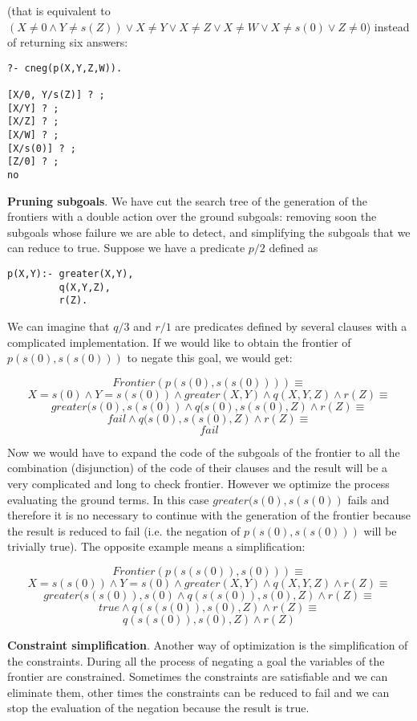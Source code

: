 \documentclass{llncs}
\begin{document}
\noindent
(that is equivalent to $ (X \neq0 \wedge Y\neq s(Z)) \vee X \neq Y
\vee X \neq Z \vee X \neq W \vee X \neq s(0) \vee Z \neq 0$)
instead of returning six answers:
\begin{verbatim}
?- cneg(p(X,Y,Z,W)).

[X/0, Y/s(Z)] ? ;
[X/Y] ? ;
[X/Z] ? ;
[X/W] ? ;
[X/s(0)] ? ;
[Z/0] ? ;
no
\end{verbatim}


\noindent
{\bf Pruning subgoals}. We have cut the search tree of the generation
of the frontiers with a double action over the ground subgoals:
removing soon the subgoals whose failure we are able to detect, and
simplifying the subgoals that we can reduce to true. Suppose we have a
predicate $p/2$ defined as
\begin{verbatim}
p(X,Y):- greater(X,Y),
         q(X,Y,Z),
         r(Z).
\end{verbatim}
We can imagine that $q/3$ and $r/1$ are predicates defined by several
clauses with a complicated implementation. If we would like to obtain
the frontier of $p(s(0),s(s(0)))$ to negate this goal, we would get:

$$Frontier(p(s(0),s(s(0)))) \equiv $$
$${ X=s(0) \wedge Y=s(s(0)) \wedge
  greater(X,Y) \wedge q(X,Y,Z) \wedge r(Z) } \equiv $$
$${ greater(s(0),s(s(0)) \wedge q(s(0),s(s(0),Z) \wedge r(Z) } \equiv $$
$${ fail  \wedge q(s(0),s(s(0),Z) \wedge r(Z) } \equiv $$
$$fail $$

Now we would have to expand the code of the subgoals of the frontier
to all the combination (disjunction) of the code of their clauses and
the result will be a very complicated and long to check frontier.
However we optimize the process evaluating the ground terms. In this
case $greater(s(0),s(s(0))$ fails and therefore it is no necessary to
continue with the generation of the frontier because the result is
reduced to fail (i.e. the negation of $p (s(0), s(s(0)))$ will be trivially
true). The opposite example means a simplification:

$$Frontier(p(s(s(0)),s(0))) \equiv $$
$${ X=s(s(0)) \wedge Y=s(0) \wedge greater(X,Y) \wedge q(X,Y,Z) \wedge
  r(Z) } \equiv $$
$${ greater(s(s(0)),s(0) \wedge q(s(s(0)),s(0),Z) \wedge r(Z) } \equiv
$$
$${ true \wedge q(s(s(0)),s(0),Z) \wedge r(Z) } \equiv $$
$${ q(s(s(0)),s(0),Z) \wedge r(Z) } $$

\noindent
{\bf Constraint simplification}. Another way of optimization is the
simplification of the constraints.  During all the process of negating
a goal the variables of the frontier are constrained. Sometimes the
constraints are satisfiable and we can eliminate them, other times
the constraints can be reduced to fail and we can stop the evaluation
of the negation because the result is true.
 
\end{document}
